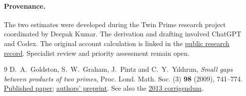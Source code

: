 \documentclass[11pt]{article}
\begin{document}
\paragraph{Provenance.}
The two estimates were developed during the Twin Prime research
project coordinated by Deepak Kumar. The derivation and drafting
involved ChatGPT and Codex. The original account calculation is
linked in the \href{https://github.com/cosmosgeek0/twin-prime-research-archive/blob/main/hosted-research-responses-2026-11-25.md}{public research record}.
Specialist review and priority assessment remain open.
\begin{thebibliography}{9}
 D.~A.~Goldston, S.~W.~Graham, J.~Pintz and C.~Y.~Y{\i}ld{\i}r{\i}m,
\emph{Small gaps between products of two primes}, Proc. Lond. Math.
Soc. (3) \textbf{98} (2009), 741--774.
\href{https://doi.org/10.1112/plms/pdn046}{Published paper};
\href{https://arxiv.org/abs/math/0609615}{authors' preprint}.
See also the \href{https://doi.org/10.1112/plms/pds053}{2013 corrigendum}.
\end{thebibliography}
\end{document}
